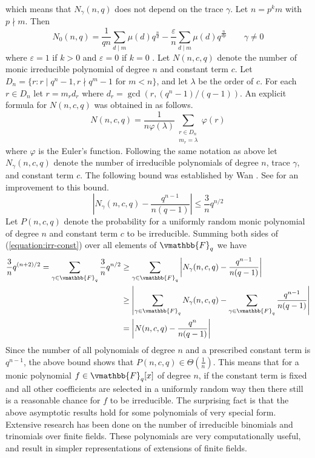 which means that $N_\gamma(n, q)$ does not depend on the trace $\gamma$. Let $n = p^km$ with $p 
\nmid m$. Then 
$$
N_0(n, q) = \frac{1}{qn}\sum_{d \mid m} \mu(d)q^{\frac{n}{d}} - \frac{\varepsilon}{n}\sum_{d \mid 
m}\mu(d)q^{\frac{n}{dp}} \qquad \gamma \ne 0
$$
where $\varepsilon = 1$ if $k > 0$ and $\varepsilon = 0$ if $k = 0$ \cite{Yucas2006}. Let $N(n, c, 
q)$ denote the number of monic irreducible polynomial of degree $n$ and constant term $c$. Let $D_n 
= \{r : r \mid q^n - 1, r \nmid q^m - 1 \text{ for } m < n\}$, and let $\lambda$ be the order of 
$c$. For each $r \in D_n$ let $r = m_rd_r$ where $d_r = \gcd(r, (q^n - 1)/(q - 1))$. An explicit 
formula for $N(n, c, q)$ was obtained in \cite{Yucas2006} as follows.
\begin{equation}
\label{equation:irr-const}
N(n, c, q) = \frac{1}{n\varphi(\lambda)}\sum_{\substack{r \in D_n \\ m_r = \lambda}} \varphi(r)
\end{equation}
where $\varphi$ is the Euler's function. Following the same notation as above let $N_\gamma(n, c, 
q)$ denote the number of irreducible polynomials of degree $n$, trace $\gamma$, and constant term 
$c$. The following bound was established by Wan \cite{Wan1997}. See \cite{Moisio2007} for an 
improvement to this bound.
\begin{equation}
\label{equation:irr-const-bound}
\left| N_\gamma(n, c, q) - \frac{q^{n - 1}}{n(q - 1)}\right| \le \frac{3}{n}q^{n / 2}
\end{equation}
Let $P(n, c, q)$ denote the probability for a uniformly random monic polynomial of degree $n$ and 
constant term $c$ to be irreducible. 
Summing both sides of (\ref{equation:irr-const}) over all elements of $\vmathbb{F}_q$ we have
\begin{align*}
\frac{3}{n}q^{(n + 2) / 2} = \sum_{\gamma \in \vmathbb{F}_q}\frac{3}{n}q^{n / 2} 
& \ge \sum_{\gamma \in \vmathbb{F}_q} \left| N_\gamma(n, c, q) - \frac{q^{n - 1}}{n(q - 1)}\right| \\
& \ge \left| \sum_{\gamma \in \vmathbb{F}_q}N_\gamma(n, c, q) - \sum_{\gamma \in 
\vmathbb{F}_q}\frac{q^{n - 1}}{n(q - 1)}\right| \\
& = \left| N(n, c, q) - \frac{q^n}{n(q - 1)}\right|
\end{align*}
Since the number of all polynomials of degree $n$ and a prescribed constant term is $q^{n - 1}$, the 
above bound shows that $P(n, c, q) \in \Theta(\frac{1}{n})$. This means that for a monic polynomial 
$f \in \vmathbb{F}_q[x]$ of degree $n$, if the constant term is fixed and all other coefficients are 
selected in a uniformly random way then there still is a reasonable chance for $f$ to be 
irreducible. The surprising fact is that the above asymptotic results hold for some polynomials of 
very special form. Extensive research has been done on the number of irreducible binomials and 
trinomials over finite fields. These polynomials are very computationally useful, and result in 
simpler representations of extensions of finite fields. 

